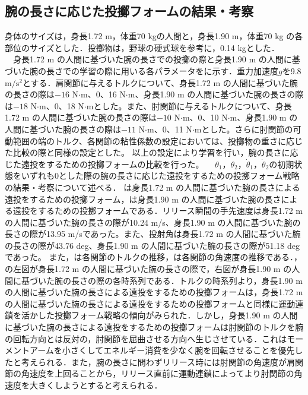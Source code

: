 \begin{small}
\subsection{腕の長さに応じた投擲フォームの結果・考察}
身体のサイズは，身長1.72 m，体重70 kgの人間と，身長1.90 m，体重70 kg の各部位のサイズとした．投擲物は，野球の硬式球を参考に，0.14 kgとした．\\
　身長1.72 m の人間に基づいた腕の長さでの投擲の際と身長1.90 m の人間に基づいた腕の長さでの学習の際に用いる各パラメータをに示す．重力加速度$g$を9.8 $\mathrm{m/s^{2}}$とする．肩関節に与えるトルクについて、身長1.72 m の人間に基づいた腕の長さの際は$-16$ N$\cdot$m、0、16 N$\cdot$m、身長1.90 m の人間に基づいた腕の長さの際は$-18$ N$\cdot$m、0、18 N$\cdot$mとした。また、肘関節に与えるトルクについて、身長1.72 m の人間に基づいた腕の長さの際は$-10$ N$\cdot$m、0、10 N$\cdot$m、身長1.90 m の人間に基づいた腕の長さの際は$-11$ N$\cdot$m、0、11 N$\cdot$mとした。さらに肘関節の可動範囲の端のトルク、各関節の粘性係数の設定においては、投擲物の重さに応じた比較の際と同様の設定とした。
以上の設定により学習を行い，腕の長さに応じた遠投をするための投擲フォームの比較を行った。
　$\theta_{1}$，$\theta_{2}$，$\dot{\theta}_{1}$，$\dot{\theta}_{2}$の初期状態をいずれも0とした際の腕の長さに応じた遠投をするための投擲フォーム戦略の結果・考察について述べる．
は身長1.72 m の人間に基づいた腕の長さによる遠投をするための投擲フォーム，は身長1.90 m の人間に基づいた腕の長さによる遠投をするための投擲フォームである．リリース瞬間の手先速度は身長1.72 m の人間に基づいた腕の長さの際が10.24 m/s、身長1.90 m の人間に基づいた腕の長さの際が13.95 m/sであった。また、投射角は身長1.72 m の人間に基づいた腕の長さの際が43.76 deg、身長1.90 m の人間に基づいた腕の長さの際が51.18 deg であった。
また，は各関節のトルクの推移，は各関節の角速度の推移である．，の左図が身長1.72 m の人間に基づいた腕の長さの際で，右図が身長1.90 m の人間に基づいた腕の長さの際の各時系列である．トルクの時系列より，身長1.90 m の人間に基づいた腕の長さによる遠投をするための投擲フォームは，身長1.72 m の人間に基づいた腕の長さによる遠投をするための投擲フォームと同様に運動連鎖を活かした投擲フォーム戦略の傾向がみられた．しかし，身長1.90 m の人間に基づいた腕の長さによる遠投をするための投擲フォームは肘関節のトルクを腕の回転方向とは反対の，肘関節を屈曲させる方向へ生じさせている．これはモーメントアームを小さくしてエネルギー消費を少なく腕を回転させることを優先したと考えられる．また，腕の長さに問わずリリース時には肘関節の角速度が肩関節の角速度を上回ることから，リリース直前に運動連鎖によってより肘関節の角速度を大きくしようとすると考えられる．

\end{small}
